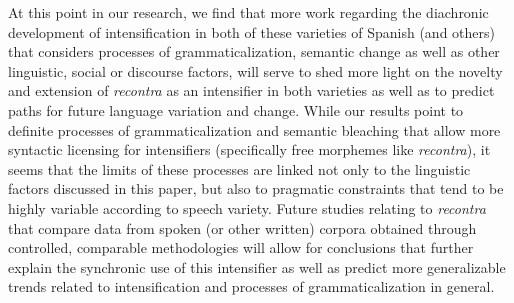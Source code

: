 \documentclass[output=paper,colorlinks,citecolor=brown,
]{langscibook}
\begin{document}
At this point in our research, we find that more work regarding the diachronic development of intensification in both of these varieties of Spanish (and others) that considers processes of grammaticalization, semantic change as well as other linguistic, social or discourse factors, will serve to shed more light on the novelty and extension of \textit{recontra} as an intensifier in both varieties as well as to predict paths for future language variation and change. While our results point to definite processes of grammaticalization and semantic bleaching that allow more syntactic licensing for intensifiers (specifically free morphemes like \textit{recontra}), it seems that the limits of these processes are linked not only to the linguistic factors discussed in this paper, but also to pragmatic constraints that tend to be highly variable according to speech variety. Future studies relating to \textit{recontra} that compare data from spoken (or other written) corpora obtained through controlled, comparable methodologies will allow for conclusions that further explain the synchronic use of this intensifier as well as predict more generalizable trends related to intensification and processes of grammaticalization in general.
 
 

 
 
 
\printbibliography[heading=subbibliography,notkeyword=this]
\end{document}
